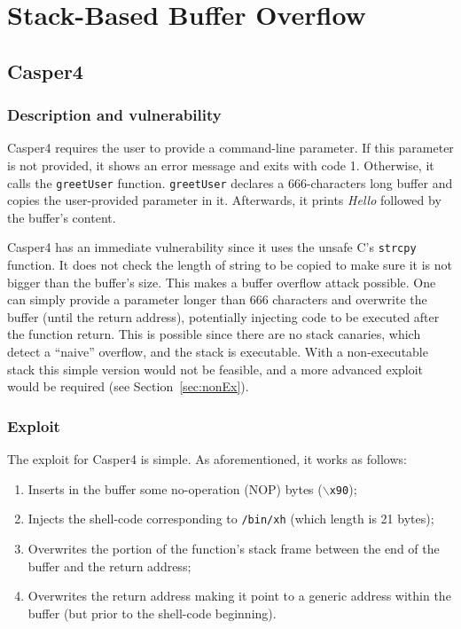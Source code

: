 \section{Stack-Based Buffer Overflow}
\subsection{Casper4}\label{sec:casper4}
\subsubsection{Description and vulnerability}
Casper4 requires the user to provide a command-line parameter. If this parameter is not provided, it shows an error message and exits with code 1. Otherwise, it calls the \texttt{greetUser} function. \texttt{greetUser} declares a 666-characters long buffer and copies the user-provided parameter in it. Afterwards, it prints \textit{Hello} followed by the buffer's content.

Casper4 has an immediate vulnerability since it uses the unsafe C's \texttt{strcpy} function. It does not check the length of string to be copied to make sure it is not bigger than the buffer's size. This makes a buffer overflow attack possible. One can simply provide a parameter longer than 666 characters and overwrite the buffer (until the return address), potentially injecting code to be executed after the function return. This is possible since there are no stack canaries, which detect a ``naive'' overflow, and the stack is executable. With a non-executable stack this simple version would not be feasible, and a more advanced exploit would be required (see Section~\ref{sec:nonEx}).

\subsubsection{Exploit}
The exploit for Casper4 is simple. As aforementioned, it works as follows:
\begin{enumerate}
	\item Inserts in the buffer some no-operation (NOP) bytes (\texttt{$\backslash$x90});
	\item Injects the shell-code corresponding to \texttt{/bin/xh} (which length is 21 bytes);
	\item Overwrites the portion of the function's stack frame between the end of the buffer and the return address;
	\item Overwrites the return address making it point to a generic address within the buffer (but prior to the shell-code beginning).
\end{enumerate}

